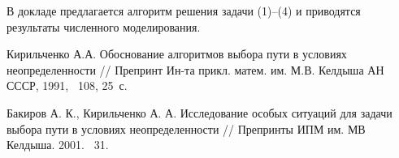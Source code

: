 В докладе предлагается алгоритм решения задачи (1)--(4) и приводятся результаты численного моделирования.


\setcounter{equation}{0}
\setcounter{figure}{0}

\small


\begin{thebibliography}{9} %
 Кирильченко А.А. Обоснование алгоритмов выбора пути в условиях неопределенности  // Препринт Ин-та прикл. матем. им. М.В. Келдыша АН СССР, 1991, \textnumero~108, 25~с.

 Бакиров А. К., Кирильченко А. А. Исследование особых ситуаций для задачи выбора пути в условиях неопределенности // Препринты ИПМ им. МВ Келдыша.  2001.   \textnumero~31.

\end{thebibliography}





%

